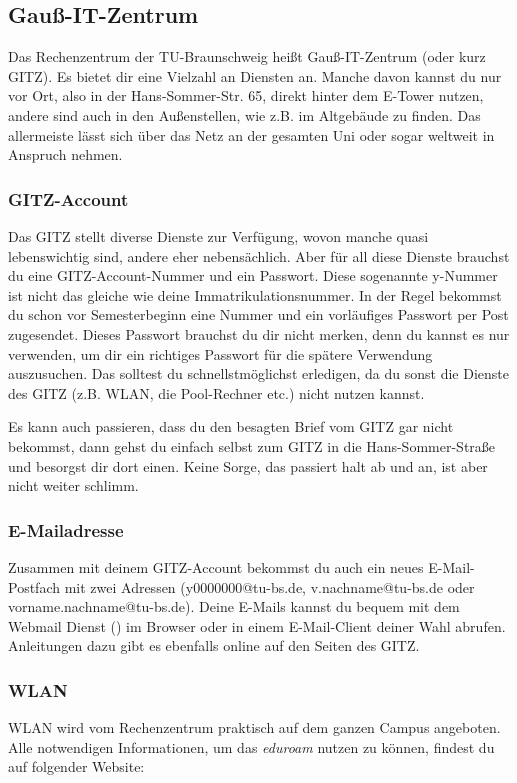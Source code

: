 
\subsection{Gauß-IT-Zentrum}

	Das Rechenzentrum der TU-Braunschweig heißt Gauß-IT-Zentrum (oder kurz GITZ). Es bietet dir eine Vielzahl an Diensten an. Manche davon kannst du nur vor Ort, also in der Hans-Sommer-Str. 65, direkt hinter dem E-Tower nutzen, andere sind auch in den Außenstellen, wie z.B. im Altgebäude zu finden. Das allermeiste lässt sich über das Netz an der gesamten Uni oder sogar weltweit in Anspruch nehmen.

\subsubsection{GITZ-Account}
\label{todogitz}
	Das GITZ stellt diverse Dienste zur Verfügung, wovon manche quasi lebenswichtig sind, andere eher nebensächlich. Aber für all diese Dienste brauchst du eine GITZ-Account-Nummer und ein Passwort. Diese sogenannte y-Nummer ist nicht das gleiche wie deine Immatrikulationsnummer. In der Regel bekommst du schon vor Semesterbeginn eine Nummer und ein vorläufiges Passwort per Post zugesendet. Dieses Passwort brauchst du dir nicht merken, denn du kannst es nur verwenden, um dir ein richtiges Passwort für die spätere Verwendung auszusuchen. Das solltest du schnellstmöglichst erledigen, da du sonst die Dienste des GITZ (z.B. WLAN, die Pool-Rechner etc.) nicht nutzen kannst.
	
	Es kann auch passieren, dass du den besagten Brief vom GITZ  gar nicht bekommst, dann gehst du einfach selbst zum GITZ in die Hans-Sommer-Straße und besorgst dir dort einen. Keine Sorge, das passiert halt ab und an, ist aber nicht weiter schlimm.

	\subsubsection{E-Mailadresse}
		Zusammen mit deinem GITZ-Account bekommst du auch ein neues E-Mail-Postfach mit zwei Adressen (y0000000@tu-bs.de, v.nachname@tu-bs.de oder vorname.nachname@tu-bs.de). Deine E-Mails kannst du bequem mit dem Webmail Dienst () im Browser oder in einem E-Mail-Client deiner Wahl abrufen. Anleitungen dazu gibt es ebenfalls online auf den Seiten des GITZ.

	\subsubsection{WLAN}
		\label{wlan}
		WLAN wird vom Rechenzentrum praktisch auf dem ganzen Campus angeboten. Alle notwendigen Informationen, um das \emph{eduroam} nutzen zu können, findest du auf folgender Website: 

